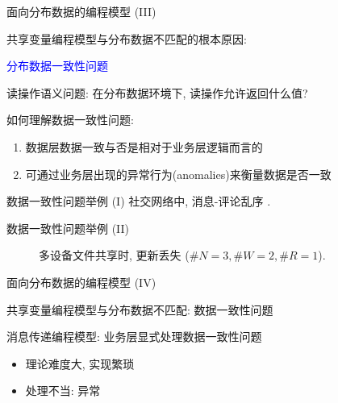 \begin{frame}{面向分布数据的编程模型 (III)}
  \begin{center}
    共享变量编程模型与分布数据不匹配的根本原因: 

    \textcolor{blue}{\large 分布数据一致性问题}
  \end{center}

  \begin{cdef}
    读操作语义问题: 在分布数据环境下, 读操作允许返回什么值?
  \end{cdef}

  \pause
  \begin{alertblock}{如何理解数据一致性问题:}
    \begin{enumerate}
      \item 数据层数据一致与否是相对于业务层逻辑而言的
      \item 可通过业务层出现的异常行为(anomalies)来衡量数据是否一致
    \end{enumerate}
  \end{alertblock}
\end{frame}
\begin{frame}{数据一致性问题举例 (I)}
  {社交网络中, 消息-评论乱序 .}
\end{frame}
\begin{frame}{数据一致性问题举例 (II)}
  \begin{figure}[h!]
    \centering
    \begin{adjustbox}{max totalsize = {0.65\textwidth}{0.65\textheight}, center}
      
    \end{adjustbox}
    \caption{多设备文件共享时, 更新丢失 ($\#N = 3, \#W = 2, \#R = 1$).}
  \end{figure}
\end{frame}
\begin{frame}{面向分布数据的编程模型 (IV)}
  \begin{center}
    共享变量编程模型与分布数据不匹配: 数据一致性问题 
  \end{center}

  \vspace{0.50cm}
  消息传递编程模型: 业务层显式处理数据一致性问题
  \begin{itemize}
    \item 理论难度大, 实现繁琐
    \item 处理不当: 异常
  \end{itemize}
\end{frame}
